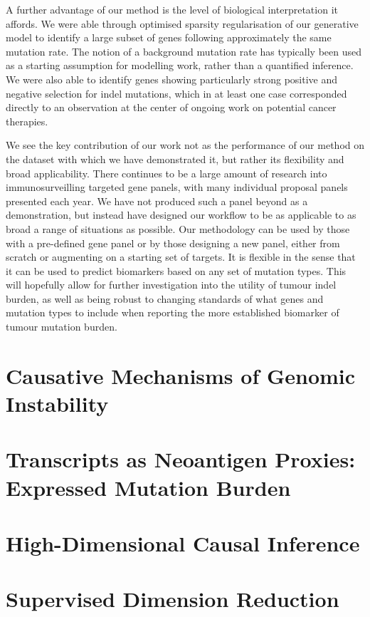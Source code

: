 \documentclass[10pt,twoside,openright]{report}
\begin{document}
 A further advantage of our method is the level of biological interpretation it affords. We were able through optimised sparsity regularisation of our generative model to identify a large subset of genes following approximately the same mutation rate. The notion of a background mutation rate has typically been used as a starting assumption for modelling work, rather than a quantified inference. We were also able to identify genes showing particularly strong positive and negative selection for indel mutations, which in at least one case corresponded directly to an observation at the center of ongoing work on potential cancer therapies. 
 
We see the key contribution of our work not as the performance of our method on the dataset with which we have demonstrated it, but rather its flexibility and broad applicability. There continues to be a large amount of research into immunosurveilling targeted gene panels, with many individual proposal panels presented each year. We have not produced such a panel beyond as a demonstration, but instead have designed our workflow to be as applicable to as broad a range of situations as possible. Our methodology can be used by those with a pre-defined gene panel or by those designing a new panel, either from scratch or augmenting on a starting set of targets. It is flexible in the sense that it can be used to predict biomarkers based on any set of mutation types. This will hopefully allow for further investigation into the utility of tumour indel burden, as well as being robust to changing standards of what genes and mutation types to include when reporting the more established biomarker of tumour mutation burden.
\chapter{Causative Mechanisms of Genomic Instability}

\chapter{Transcripts as Neoantigen Proxies: Expressed Mutation Burden}



\appendix

\chapter{High-Dimensional Causal Inference}

\chapter{Supervised Dimension Reduction}
\end{document}
